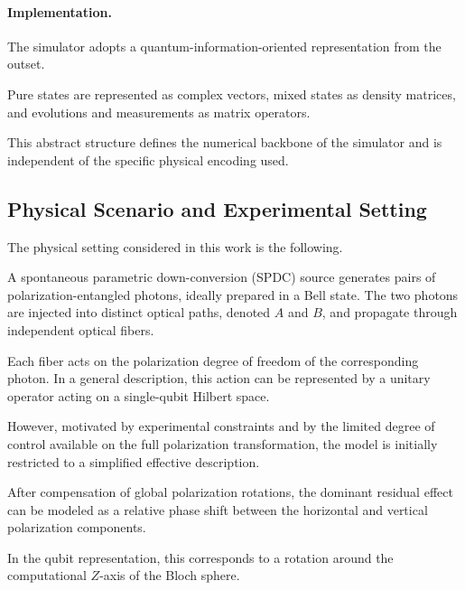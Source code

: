 \documentclass[a4paper]{article}
\begin{document}
\paragraph{Implementation.}

The simulator adopts a quantum-information-oriented representation from the outset.

Pure states are represented as complex vectors, mixed states as density matrices, and evolutions and measurements as matrix operators.

This abstract structure defines the numerical backbone of the simulator and is independent of the specific physical encoding used.


\subsection{Physical Scenario and Experimental Setting}

The physical setting considered in this work is the following.

A spontaneous parametric down-conversion (SPDC) source generates pairs of polarization-entangled photons, ideally prepared in a Bell state. The two photons are injected into distinct optical paths, denoted \( A \) and \( B \), and propagate through independent optical fibers.

\medskip

Each fiber acts on the polarization degree of freedom of the corresponding photon. In a general description, this action can be represented by a unitary operator acting on a single-qubit Hilbert space.

However, motivated by experimental constraints and by the limited degree of control available on the full polarization transformation, the model is initially restricted to a simplified effective description.

\medskip

After compensation of global polarization rotations, the dominant residual effect can be modeled as a relative phase shift between the horizontal and vertical polarization components.

In the qubit representation, this corresponds to a rotation around the computational \( Z \)-axis of the Bloch sphere.

\medskip
\end{document}
